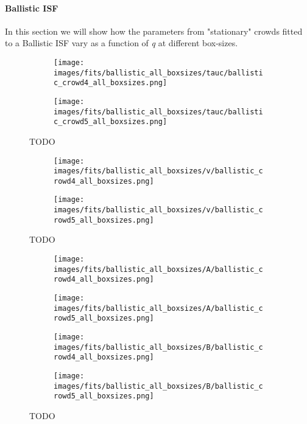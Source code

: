 \documentclass[10pt]{article}
\begin{document}
\paragraph{Ballistic ISF} In this section we will show how the parameters from "stationary" crowds fitted to a Ballistic ISF vary as a function of \textit{q} at different box-sizes. 

\begin{figure}[H]
\begin{subfigure}[t]{\textwidth}
  \centering
 \texttt{[image: images/fits/ballistic\_all\_boxsizes/tauc/ballistic\_crowd4\_all\_boxsizes.png]}
  \caption{}
\end{subfigure}%
\hfill
\begin{subfigure}[t]{\textwidth}
  \centering
  \texttt{[image: images/fits/ballistic\_all\_boxsizes/tauc/ballistic\_crowd5\_all\_boxsizes.png]}
  \caption{}
\end{subfigure}
\caption{TODO}
\label{fig:crowd_ballistic_fits_tauc_all_boxsizes}
\end{figure}

\begin{figure}[H]
\begin{subfigure}[t]{\textwidth}
  \centering
 \texttt{[image: images/fits/ballistic\_all\_boxsizes/v/ballistic\_crowd4\_all\_boxsizes.png]}
  \caption{}
\end{subfigure}%
\hfill
\begin{subfigure}[t]{\textwidth}
  \centering
  \texttt{[image: images/fits/ballistic\_all\_boxsizes/v/ballistic\_crowd5\_all\_boxsizes.png]}
  \caption{}
\end{subfigure}
\caption{TODO}
\label{fig:crowd_ballistic_fits_v_all_boxsizes}
\end{figure}

\begin{figure}[H]
\begin{subfigure}[t]{.5\textwidth}
  \centering
 \texttt{[image: images/fits/ballistic\_all\_boxsizes/A/ballistic\_crowd4\_all\_boxsizes.png]}
  \caption{}
\end{subfigure}%
\hfill
\begin{subfigure}[t]{.5\textwidth}
  \centering
  \texttt{[image: images/fits/ballistic\_all\_boxsizes/A/ballistic\_crowd5\_all\_boxsizes.png]}
  \caption{}
\end{subfigure}
\label{fig:crowd_ballistic_fits_A_all_boxsizes}
\par\bigskip
\begin{subfigure}[t]{.5\textwidth}
  \centering
 \texttt{[image: images/fits/ballistic\_all\_boxsizes/B/ballistic\_crowd4\_all\_boxsizes.png]}
  \caption{}
\end{subfigure}%
\hfill
\begin{subfigure}[t]{.5\textwidth}
  \centering
  \texttt{[image: images/fits/ballistic\_all\_boxsizes/B/ballistic\_crowd5\_all\_boxsizes.png]}
  \caption{}
\end{subfigure}
\caption{TODO}
\label{fig:crowd_ballistic_fits_tauc_B_boxsizes}
\end{figure}
\end{document}
